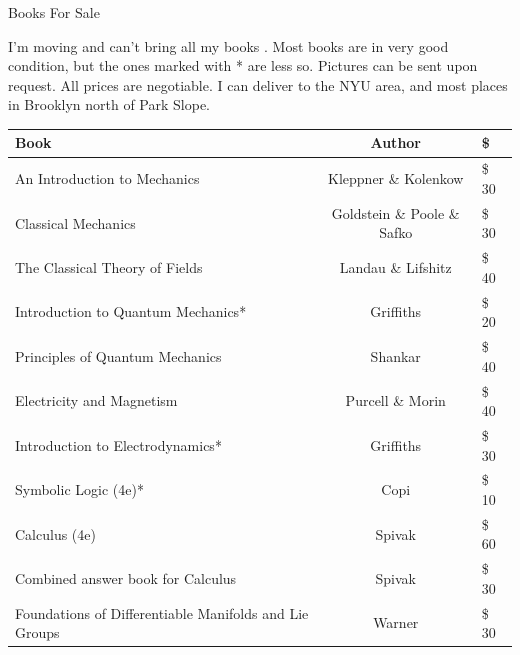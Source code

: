 \documentclass[12pt]{article}
\begin{document}
\pagestyle{empty}
\renewcommand{\arraystretch}{1.2}

\begin{center}
    \fontsize{86}{0}\selectfont Books For Sale
\end{center}

\noindent I'm moving and can't bring all my books \frownie{}.
Most books are in very good condition, but the ones marked with * are less so.
Pictures can be sent upon request.
All prices are negotiable.
I can deliver to the NYU area, and most places in Brooklyn north of Park Slope.

\begin{center}
    \begin{tabular}{l c >{\$}l}
        Book                                                   & Author                      & \multicolumn{1}{c}{Price} \\ \toprule
        An Introduction to Mechanics                           & Kleppner \& Kolenkow        & 30                        \\
        Classical Mechanics                                    & Goldstein \& Poole \& Safko & 30                        \\
        The Classical Theory of Fields                         & Landau \& Lifshitz          & 40                        \\
        Introduction to Quantum Mechanics*                     & Griffiths                   & 20                        \\
        Principles of Quantum Mechanics                        & Shankar                     & 40                        \\
        Electricity and Magnetism                              & Purcell \& Morin            & 40                        \\
        Introduction to Electrodynamics*                       & Griffiths                   & 30                        \\
        Symbolic Logic (4e)*                                   & Copi                        & 10                        \\
        Calculus (4e)                                          & Spivak                      & 60                        \\
        Combined answer book for Calculus                      & Spivak                      & 30                        \\
        Foundations of Differentiable Manifolds and Lie Groups & Warner                      & 30                        \\

\end{tabular}
\end{center}
\end{document}
